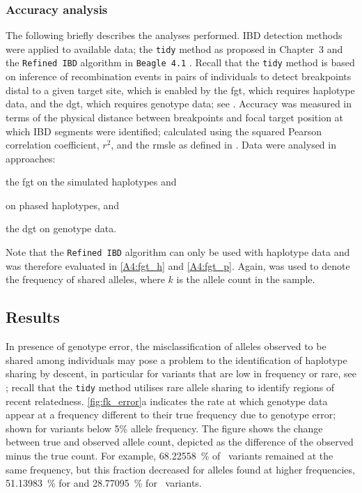 %
\subsubsection{Accuracy analysis}
%

The following briefly describes the analyses performed.
 IBD detection methods were applied to available data; the \texttt{tidy} method as proposed in Chapter~3 and the \texttt{Refined\,IBD} algorithm in \texttt{Beagle\,4.1} \citep{Browning:2013eh}.
Recall that the \texttt{tidy} method is based on inference of recombination events in pairs of individuals to detect breakpoints distal to a given target site, which is enabled by the \gls{fgt}, which requires haplotype data, and the \gls{dgt}, which requires genotype data; see .
Accuracy was measured in terms of the physical distance between breakpoints and focal target position at which IBD segments were identified; calculated using the squared Pearson correlation coefficient, $r^2$, and the \gls{rmsle} as defined in .
Data were analysed in  approaches:
\begin{approach_}
\item\label{A4:fgt_h} the \gls{fgt} on the simulated haplotypes and
\item\label{A4:fgt_p} on phased haplotypes, and
\item\label{A4:dgt} the \gls{dgt} on genotype data.
\end{approach_}
Note that the \texttt{Refined\,IBD} algorithm can only be used with haplotype data and was therefore evaluated in \ref{A4:fgt_h} and \ref{A4:fgt_p}.
Again, \fk{} was used to denote the frequency of shared alleles, where $k$ is the allele count in the sample.



%
\subsection{Results}
\label{sec:ibd_results_err}
%

In presence of genotype error, the misclassification of alleles observed to be shared among individuals may pose a problem to the identification of haplotype sharing by descent, in particular for variants that are low in frequency or rare, see ; recall that the \texttt{tidy} method utilises rare allele sharing to identify regions of recent relatedness.
\cref{fig:fk_error}{a} indicates the rate at which genotype data appear at a frequency different to their true frequency due to genotype error; shown for variants below 5\% allele frequency.
The figure shows the change between true and observed allele count, depicted as the difference of the observed minus the true count.
For example, \SI{68.22558}{\percent} of ~variants remained at the same frequency, but this fraction decreased for alleles found at higher frequencies, \eg \SI{51.13983}{\percent} for  and \SI{28.77095}{\percent} for ~variants.

